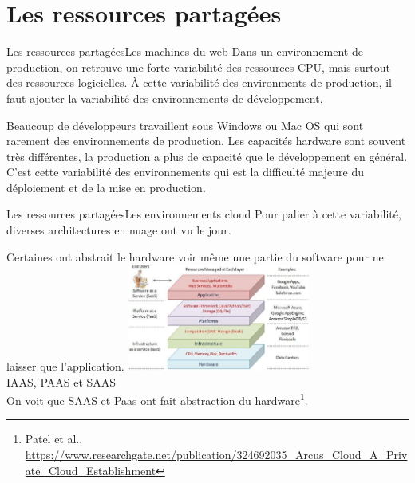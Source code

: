 \documentclass{beamer}
\begin{document}
    \section{Les ressources partagées}\label{sec:le-ressources-partagees}

    \begin{frame}{Les ressources partagées}{Les machines du web}
        Dans un environnement de production, on retrouve une forte variabilité des ressources CPU, mais surtout des ressources logicielles.
        \bigbreak
        À cette variabilité des environments de production, il faut ajouter la variabilité des environnements de développement.

        Beaucoup de développeurs travaillent sous Windows ou Mac OS qui sont rarement des environnements de production.
        Les capacités hardware sont souvent très différentes, la production a plus de capacité que le développement en général.
        \bigbreak
        C'est cette variabilité des environnements qui est la difficulté majeure du déploiement et de la mise en production.
    \end{frame}

    \begin{frame}{Les ressources partagées}{Les environnements cloud}
        Pour palier à cette variabilité, diverses architectures en nuage ont vu le jour.

        Certaines ont abstrait le hardware voir même une partie du software pour ne laisser que l'application.
        \bigbreak
        \centering
        \includegraphics[width=6cm]{image/cloud-stacks} \\ IAAS, PAAS et SAAS\\
        \flushleft
        On voit que SAAS et Paas ont fait abstraction du hardware\footnote{\label{arcuscloud}Patel et al., \url{https://www.researchgate.net/publication/324692035_Arcus_Cloud_A_Private_Cloud_Establishment}}.
    \end{frame}
\end{document}
